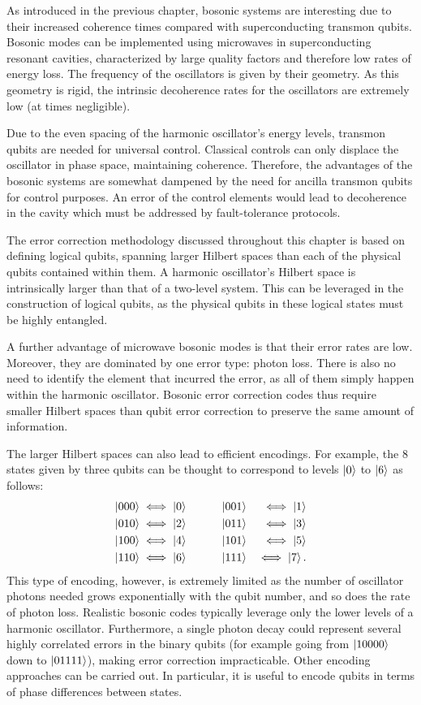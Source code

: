 As introduced in the previous chapter, bosonic systems are interesting due to their increased coherence times compared with superconducting transmon qubits. Bosonic modes can be implemented using microwaves in superconducting resonant cavities, characterized by large quality factors and therefore low rates of energy loss. The frequency of the oscillators is given by their geometry. As this geometry is rigid, the intrinsic decoherence rates for the oscillators are extremely low (at times negligible). 

Due to the even spacing of the harmonic oscillator's energy levels, transmon qubits are needed for universal control. Classical controls can only displace the oscillator in phase space, maintaining coherence. Therefore, the advantages of the bosonic systems are somewhat dampened by the need for ancilla transmon qubits for control purposes. An error of the control elements would lead to decoherence in the cavity which must be addressed by fault-tolerance protocols.

The error correction methodology discussed throughout this chapter is based on defining logical qubits, spanning larger Hilbert spaces than each of the physical qubits contained within them. A harmonic oscillator's Hilbert space is intrinsically larger than that of a two-level system. This can be leveraged in the construction of logical qubits, as the physical qubits in these logical states must be highly entangled.

A further advantage of microwave bosonic modes is that their error rates are low. Moreover, they are dominated by one error type: photon loss. There is also no need to identify the element that incurred the error, as all of them simply happen within the harmonic oscillator. Bosonic error correction codes thus require smaller Hilbert spaces than qubit error correction to preserve the same amount of information.

The larger Hilbert spaces can also lead to efficient encodings. For example, the 8 states given by three qubits can be thought to correspond to levels $\ket{0}$ to $\ket{6}$ as follows:
\begin{eqnarray}
    \ket{000} & \iff \ket{0} \qquad \quad \ket{001} & \iff \ket{1} \notag\\ 
    \ket{010} & \iff \ket{2} \qquad \quad \ket{011} & \iff \ket{3} \notag\\
    \ket{100} & \iff \ket{4} \qquad \quad \ket{101} & \iff \ket{5} \notag\\
    \ket{110} & \iff \ket{6} \qquad \quad \ket{111} & \iff \ket{7}.
\end{eqnarray}
This type of encoding, however, is extremely limited as the number of oscillator photons needed grows exponentially with the qubit number, and so does the rate of photon loss. Realistic bosonic codes typically leverage only the lower levels of a harmonic oscillator. Furthermore, a single photon decay could represent several highly correlated errors in the binary qubits (for example going from $\ket{10000}$ down to $\ket{01111}$), making error correction impracticable. Other encoding approaches can be carried out. In particular, it is useful to encode qubits in terms of phase differences between states. 

